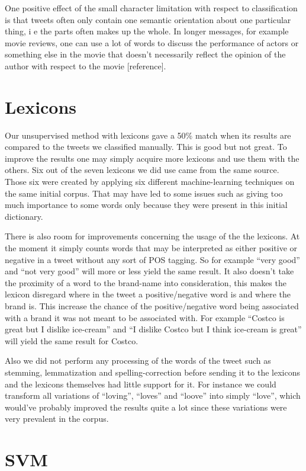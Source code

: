 \documentclass[a4paper,12pt]{report}
\begin{document}
One positive effect of the small character limitation with respect to classification is that tweets often only contain one semantic orientation about one particular thing, i e the parts often makes up the whole. In longer messages, for example movie reviews, one can use a lot of words to discuss the performance of actors or something else in the movie that doesn’t necessarily reflect the opinion of the author with respect to the movie [reference].

\section{Lexicons}

Our unsupervised method with lexicons gave a 50\% match when its results are compared to the tweets we classified manually. This is good but not great. To improve the results one may  simply acquire more lexicons and use them with the others. Six out of the seven lexicons we did use came from the same source. Those six were created by applying six different machine-learning techniques on the same initial corpus. That may have led to some issues such as giving too much importance to some words only because they were present in this initial dictionary.

There is also room for improvements concerning the usage of the the lexicons. At the moment it simply counts words that may be interpreted as either positive or negative in a tweet without any sort of POS tagging. So for example “very good” and “not very good” will more or less yield the same result. It also doesn’t take the proximity of a word to the brand-name into consideration, this makes the lexicon disregard where in the tweet a positive/negative word is and where the brand is. This increase the chance of the positive/negative word being associated with a brand it was not meant to be associated with. For example “Costco is great but I dislike ice-cream” and “I dislike Costco but I think ice-cream is great” will yield the same result for Costco.

Also we did not perform any processing of the words of the tweet such as stemming, lemmatization and spelling-correction before sending it to the lexicons and the lexicons themselves had little support for it. For instance we could transform all variations of “loving”, “loves” and “loove” into simply “love”, which would’ve probably improved the results quite a lot since these variations were very prevalent in the corpus.

\section{SVM}
\end{document}
